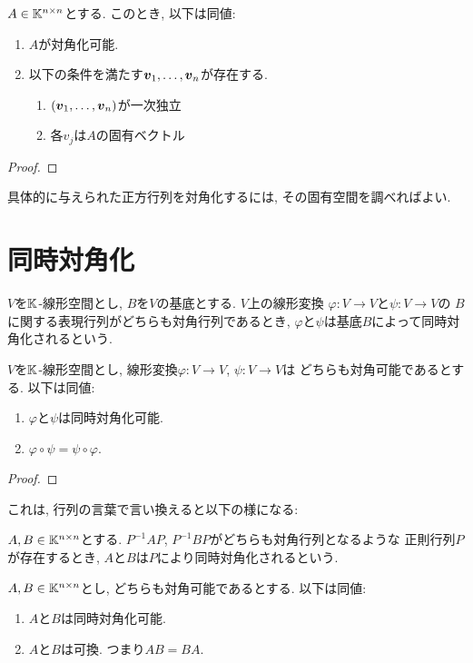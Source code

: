 \begin{prop}
  $A\in\mathbb{K}^{n\times n}$とする.
  このとき, 以下は同値:
  \begin{enumerate}
  \item $A$が対角化可能.
  \item
    以下の条件を満たす$\boldsymbol{v}_1,\ldots,\boldsymbol{v}_n$が存在する.
\begin{enumerate}
\item $(\boldsymbol{v}_1,\ldots,\boldsymbol{v}_n)$が一次独立
\item  各$v_j$は$A$の固有ベクトル
  \end{enumerate}
  \end{enumerate}
\end{prop}
\begin{proof}\end{proof}

\begin{remark}
具体的に与えられた正方行列を対角化するには,
その固有空間を調べればよい.
\end{remark}

\section{同時対角化}
\begin{definition}
$V$を$\mathbb{K}$-線形空間とし,
$B$を$V$の基底とする.
$V$上の線形変換
$\varphi\colon V\to V$と$\psi\colon V\to V$の
$B$に関する表現行列がどちらも対角行列であるとき,
$\varphi$と$\psi$は基底$B$によって同時対角化されるという.
\end{definition}

\begin{prop}
$V$を$\mathbb{K}$-線形空間とし,
線形変換$\varphi\colon V\to V$,
$\psi\colon V\to V$は
どちらも対角可能であるとする.
以下は同値:
\begin{enumerate}
\item $\varphi$と$\psi$は同時対角化可能.
\item $\varphi\circ\psi=\psi\circ\varphi$.
\end{enumerate}
\end{prop}
\begin{proof}\end{proof}


これは, 行列の言葉で言い換えると以下の様になる:
\begin{definition}
$A,B\in\mathbb{K}^{n\times n}$とする.
$P^{-1}AP$, $P^{-1}BP$がどちらも対角行列となるような
正則行列$P$が存在するとき,
$A$と$B$は$P$により同時対角化されるという.
\end{definition}
\begin{prop}
$A,B\in\mathbb{K}^{n\times n}$とし,
どちらも対角可能であるとする.
以下は同値:
\begin{enumerate}
\item $A$と$B$は同時対角化可能.
\item $A$と$B$は可換. つまり$AB=BA$.
\end{enumerate}
\end{prop}

